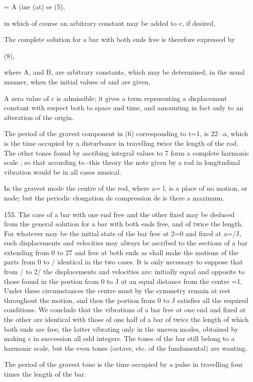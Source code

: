 = A (ine (at) se (5),

in which of course an arbitrary constant may be added to c, if desired,

The complete solution for a bar with both ends free is therefore
expressed by

(8),

where A, and B, are arbitrary constants, which may be determined, in the
usual manner, when the initial values of and are given,

A zero value of c is admissible; it gives a term representing a
displacement constant with respect both to space and time, and amounting
in fact only to an alteration of the origin.

The period of the gravest component in (6) corresponding to t=1, is
22--.a, which is the time occupied by a disturbance in travelling twice
the length of the rod. The other tones found by ascribing integral
values to 7 form a complete harmonic scale ; so that according to -this
theory the note given by a rod in longitudinal vibration would be in all
cases musical.

In the gravest mode the centre of the rod, where a= l, is a place of no
motion, or node; but the periodic elongation de
compression de is there a maximum.

153. The case of a bar with one end free and the other fixed may be
deduced from the general solution for a bar with both ends free, and of
twice the length. For whatever may be the initial state of the bar free
at 2=0 and fixed at a=/J, such displacements and velocities may always
be ascribed to the sections of a bar extending from 0 to 27 and free at
both ends as shall make the motions of the parts from 0 to / identical
in the two cases. It is only necessary to suppose that from / to 2/ the
displacements and velocities are: initially equal and opposite to those
found in the portion from 0 to J at an equal distance from the centre
=1, Under these circumstances the centre must by the symmetry remain at
rest throughout the motion, and then the portion from 0 to J satisfies
all the required conditions. We conclude that the vibrations of a bar
free at one end and fixed at the other are identical with those of one
half of a bar of twice the length of which both ends are free, the
latter vibrating only in the uneven modes, obtained by making c in
succession all odd integers. The tones of the bar still belong to a
harmonic scale, but the even tones (octave, etc. of the fundamental) are
wanting.

The period of the gravest tone is the time occupied by a pulse in
travelling four times the length of the bar.

